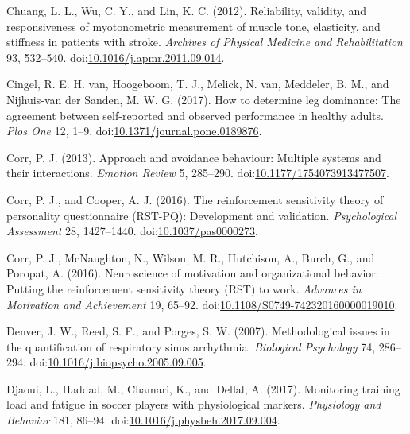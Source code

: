 \documentclass[
  english,
  man,floatsintext]{apa6}
\newlength{\cslhangindent}
\newenvironment{cslreferences}%
  {\setlength{\parindent}{0pt}%
  \everypar{\setlength{\hangindent}{\cslhangindent}}\ignorespaces}%
  {\par}
\begin{document}
\begin{cslreferences}
\leavevmode\hypertarget{ref-Chuang2012}{}%
Chuang, L. L., Wu, C. Y., and Lin, K. C. (2012). Reliability, validity, and responsiveness of myotonometric measurement of muscle tone, elasticity, and stiffness in patients with stroke. \emph{Archives of Physical Medicine and Rehabilitation} 93, 532--540. doi:\href{https://doi.org/10.1016/j.apmr.2011.09.014}{10.1016/j.apmr.2011.09.014}.

\leavevmode\hypertarget{ref-VanCingel2017}{}%
Cingel, R. E. H. van, Hoogeboom, T. J., Melick, N. van, Meddeler, B. M., and Nijhuis-van der Sanden, M. W. G. (2017). How to determine leg dominance: The agreement between self-reported and observed performance in healthy adults. \emph{Plos One} 12, 1--9. doi:\href{https://doi.org/10.1371/journal.pone.0189876}{10.1371/journal.pone.0189876}.

\leavevmode\hypertarget{ref-Corr2013}{}%
Corr, P. J. (2013). Approach and avoidance behaviour: Multiple systems and their interactions. \emph{Emotion Review} 5, 285--290. doi:\href{https://doi.org/10.1177/1754073913477507}{10.1177/1754073913477507}.

\leavevmode\hypertarget{ref-Corr2016c}{}%
Corr, P. J., and Cooper, A. J. (2016). The reinforcement sensitivity theory of personality questionnaire (RST-PQ): Development and validation. \emph{Psychological Assessment} 28, 1427--1440. doi:\href{https://doi.org/10.1037/pas0000273}{10.1037/pas0000273}.

\leavevmode\hypertarget{ref-Corr2016b}{}%
Corr, P. J., McNaughton, N., Wilson, M. R., Hutchison, A., Burch, G., and Poropat, A. (2016). Neuroscience of motivation and organizational behavior: Putting the reinforcement sensitivity theory (RST) to work. \emph{Advances in Motivation and Achievement} 19, 65--92. doi:\href{https://doi.org/10.1108/S0749-742320160000019010}{10.1108/S0749-742320160000019010}.

\leavevmode\hypertarget{ref-Denver2007}{}%
Denver, J. W., Reed, S. F., and Porges, S. W. (2007). Methodological issues in the quantification of respiratory sinus arrhythmia. \emph{Biological Psychology} 74, 286--294. doi:\href{https://doi.org/10.1016/j.biopsycho.2005.09.005}{10.1016/j.biopsycho.2005.09.005}.

\leavevmode\hypertarget{ref-Djaoui2017}{}%
Djaoui, L., Haddad, M., Chamari, K., and Dellal, A. (2017). Monitoring training load and fatigue in soccer players with physiological markers. \emph{Physiology and Behavior} 181, 86--94. doi:\href{https://doi.org/10.1016/j.physbeh.2017.09.004}{10.1016/j.physbeh.2017.09.004}.


\end{cslreferences}
\end{document}

